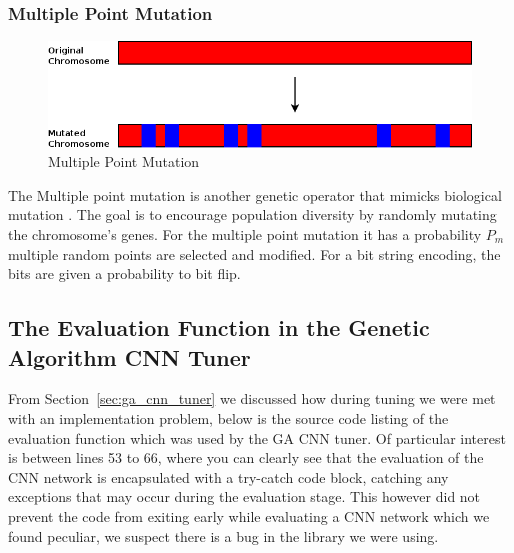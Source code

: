 \subsubsection{Multiple Point Mutation}
\begin{figure}
	\vspace{-0.2cm}
	
	\includegraphics[width=\linewidth]{sections/imgs/ga/ga_multiple_point_mutation.png}
	\caption{Multiple Point Mutation}
	\label{fig:ga_multiple_point_mutation}

	\vspace{-0.5cm}
\end{figure}

The Multiple point mutation is another genetic operator that mimicks biological mutation \cite{mitchell1998introduction}. The goal is to encourage population diversity by randomly mutating the chromosome's genes. For the multiple point mutation it has a probability $P_{m}$ multiple random points are selected and modified. For a bit string encoding, the bits are given a probability to bit flip.


\subsection{The Evaluation Function in the Genetic Algorithm CNN Tuner}
\label{sup:ga_cnn_tuner_eval_func}
From Section~\ref{sec:ga_cnn_tuner} we discussed how during tuning we were met with an implementation problem, below is the source code listing of the evaluation function which was used by the GA CNN tuner. Of particular interest is between lines 53 to 66, where you can clearly see that the evaluation of the CNN network is encapsulated with a try-catch code block, catching any exceptions that may occur during the evaluation stage. This however did not prevent the code from exiting early while evaluating a CNN network which we found peculiar, we suspect there is a bug in the library we were using.

